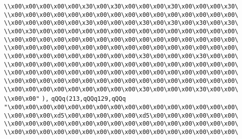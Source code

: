 \verb|\\x00\x00\x00\x00\x00\x30\x00\x30\x00\x00\x00\x30\x00\x00\x00\x30\|\newline
\verb|\\x00\x00\x00\x00\x00\x00\x00\x00\x00\x00\x00\x00\x00\x00\x00\x00\|\newline
\verb|\\x00\x00\x00\x00\x00\x30\x00\x00\x00\x30\x00\x30\x00\x30\x00\x30\|\newline
\verb|\\x00\x30\x00\x00\x00\x00\x00\x00\x00\x00\x00\x00\x00\x00\x00\x00\|\newline
\verb|\\x00\x00\x00\x00\x00\x00\x00\x00\x00\x00\x00\x00\x00\x00\x00\x00\|\newline
\verb|\\x00\x00\x00\x00\x00\x00\x00\x00\x00\x00\x00\x00\x00\x00\x00\x00\|\newline
\verb|\\x00\x00\x00\x00\x00\x00\x00\x00\x00\x30\x00\x00\x00\x30\x00\x00\|\newline
\verb|\\x00\x00\x00\x00\x00\x00\x00\x00\x00\x00\x00\x00\x00\x00\x00\x00\|\newline
\verb|\\x00\x00\x00\x00\x00\x00\x00\x00\x00\x00\x00\x00\x00\x00\x00\x00\|\newline
\verb|\\x00\x00\x00\x00\x00\x00\x00\x00\x00\x00\x00\x00\x00\x00\x00\x00\|\newline
\verb|\\x00\x00\x00\x00\x00\x00\x00\x00\x00\x30\x00\x00\x00\x30\x00\x00\|\newline
\verb|\\x00\x00"|\newline
\verb|),|\newline
\verb|qQQq(213,qQQq129,qQQq|\newline
\verb|"\x00\x00\x00\x00\x00\x00\x00\x00\x00\x00\x00\x00\x00\x00\x00\x00\|\newline
\verb|\\x00\x00\x00\xd5\x00\x00\x00\x00\x00\xd5\x00\x00\x00\x00\x00\x00\|\newline
\verb|\\x00\x00\x00\x00\x00\x00\x00\x00\x00\x00\x00\x00\x00\x00\x00\x00\|\newline
\verb|\\x00\x00\x00\x00\x00\x00\x00\x00\x00\x00\x00\x00\x00\x00\x00\x00\|\newline
